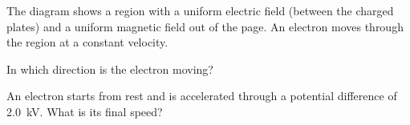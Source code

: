 \begin{quizq}{}
The diagram shows a region with a uniform electric field (between the charged plates) and a uniform
magnetic field out of the page. An electron moves through the region at a constant velocity.
\begin{center}
\end{center}
In which direction is the electron moving?
\end{quizq}

\begin{quizq}{}
An electron starts from rest and is accelerated through a potential difference of \qty{2.0}{kV}.
What is its final speed?
\end{quizq}

